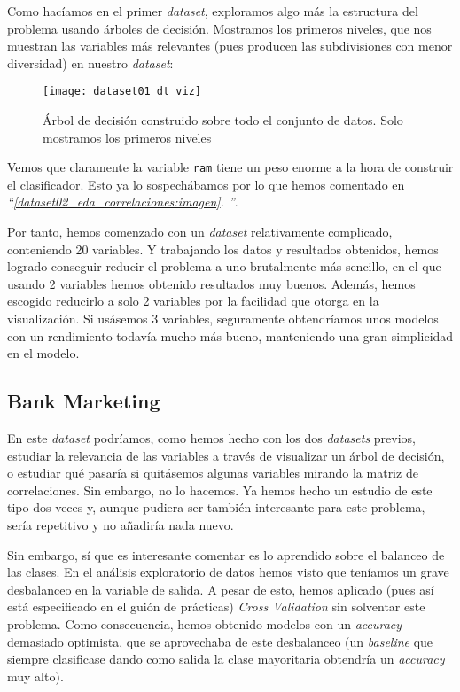 \documentclass[11pt]{article}
\newcommand{\customcite}[1]{\emph{``\ref{#1}. \nameref{#1}''}}
\begin{document}
Como hacíamos en el primer \emph{dataset}, exploramos algo más la estructura del problema usando árboles de decisión. Mostramos los primeros niveles, que nos muestran las variables más relevantes (pues producen las subdivisiones con menor diversidad) en nuestro \emph{dataset}:

\begin{figure}[H]
    \centering
    \texttt{[image: dataset01\_dt\_viz]}
    \caption{Árbol de decisión construido sobre todo el conjunto de datos. Solo mostramos los primeros niveles}
\end{figure}

Vemos que claramente la variable \lstinline{ram} tiene un peso enorme a la hora de construir el clasificador. Esto ya lo sospechábamos por lo que hemos comentado en \customcite{dataset02_eda_correlaciones:imagen}.

Por tanto, hemos comenzado con un \emph{dataset} relativamente complicado, conteniendo 20 variables. Y trabajando los datos y resultados obtenidos, hemos logrado conseguir reducir el problema a uno brutalmente más sencillo, en el que usando 2 variables hemos obtenido resultados muy buenos. Además, hemos escogido reducirlo a solo 2 variables por la facilidad que otorga en la visualización. Si usásemos 3 variables, seguramente obtendríamos unos modelos con un rendimiento todavía mucho más bueno, manteniendo una gran simplicidad en el modelo.

\pagebreak

\subsection{Bank Marketing}

En este \emph{dataset} podríamos, como hemos hecho con los dos \emph{datasets} previos, estudiar la relevancia de las variables a través de visualizar un árbol de decisión, o estudiar qué pasaría si quitásemos algunas variables mirando la matriz de correlaciones. Sin embargo, no lo hacemos. Ya hemos hecho un estudio de este tipo dos veces y, aunque pudiera ser también interesante para este problema, sería repetitivo y no añadiría nada nuevo.

Sin embargo, sí que es interesante comentar es lo aprendido sobre el balanceo de las clases. En el análisis exploratorio de datos hemos visto que teníamos un grave desbalanceo en la variable de salida. A pesar de esto, hemos aplicado (pues así está especificado en el guión de prácticas) \emph{Cross Validation} sin solventar este problema. Como consecuencia, hemos obtenido modelos con un \emph{accuracy} demasiado optimista, que se aprovechaba de este desbalanceo (un \emph{baseline} que siempre clasificase dando como salida la clase mayoritaria obtendría un \emph{accuracy} muy alto).
\end{document}
